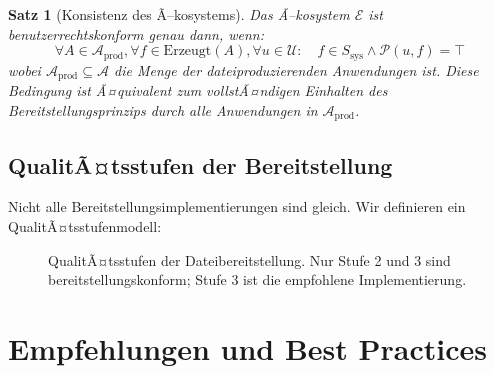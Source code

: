 ﻿\documentclass[12pt, a4paper]{article}
\newtheorem{satz}[definition]{Satz}
\begin{document}
\begin{satz}[Konsistenz des Ã–kosystems]
Das Ã–kosystem $\mathcal{E}$ ist \emph{benutzerrechtskonform} genau dann, wenn:
\[
  \forall A \in \mathcal{A}_{\text{prod}}, \forall f \in \text{Erzeugt}(A), \forall u \in \mathcal{U}:
  \quad f \in S_{\text{sys}} \wedge \mathcal{P}(u, f) = \top
\]
wobei $\mathcal{A}_{\text{prod}} \subseteq \mathcal{A}$ die Menge der dateiproduzierenden
Anwendungen ist. Diese Bedingung ist Ã¤quivalent zum vollstÃ¤ndigen Einhalten des
Bereitstellungsprinzips durch alle Anwendungen in $\mathcal{A}_{\text{prod}}$.
\end{satz}

\subsection{QualitÃ¤tsstufen der Bereitstellung}

Nicht alle Bereitstellungsimplementierungen sind gleich. Wir definieren ein
QualitÃ¤tsstufenmodell:

\begin{figure}[ht]
\centering
{}
\caption{QualitÃ¤tsstufen der Dateibereitstellung. Nur Stufe 2 und 3 sind
bereitstellungskonform; Stufe 3 ist die empfohlene Implementierung.}
\label{fig:qualitaet}
\end{figure}

\section{Empfehlungen und Best Practices}
\label{sec:empfehlungen}
\end{document}
